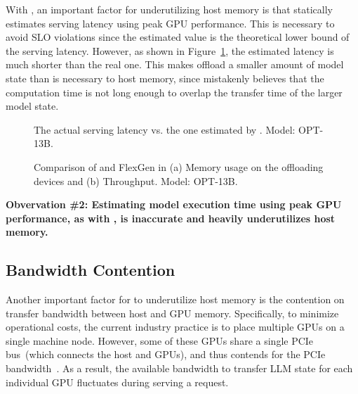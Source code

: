 With \flexgen, an important factor for underutilizing host memory is that \flexgen statically estimates serving latency using peak GPU performance. 
%
This is necessary to avoid SLO violations since the estimated value is the theoretical lower bound of the serving latency. 
%
However, as shown in Figure~\ref{fig:moti2}, the estimated latency  
is much shorter than the real one. 
%
This makes \flexgen offload a smaller amount of model state than is necessary to host memory, since \flexgen mistakenly believes that 
the computation time is not long enough to overlap the transfer time of the larger
model state. 

\begin{figure}[t]
    \centering
    \resizebox{\columnwidth}{!}{
 }
    \caption{The actual serving latency vs. the one estimated by \flexgen. Model: OPT-13B.
 }
    \label{fig:moti2}
\end{figure}

\begin{figure}[t]
    \centering
    \resizebox{\columnwidth}{!}{
 }
    \caption{Comparison of \sys and FlexGen in (a) Memory usage on the offloading devices and (b) Throughput. Model: OPT-13B.}
    \label{fig:moti2b}
\end{figure}



\noindent \textbf{Obvervation \#2: Estimating model execution time 
using peak GPU performance, as with \deepspeed, is inaccurate and 
heavily underutilizes host memory.}




\subsection{Bandwidth Contention}
\label{sec:bandwidth}

Another important factor for \flexgen to underutilize host memory is 
the contention on transfer bandwidth between host and GPU memory. 
%
Specifically, to minimize operational costs, the current industry practice is to place multiple GPUs on a single machine node. 
However, some of these GPUs share a single PCIe bus~(which connects the host and GPUs), and thus contends for the PCIe bandwidth~\cite{pciecontention, pciecontention2}. 
%
As a result, the available bandwidth to transfer LLM state for each 
individual GPU fluctuates during serving a request. 

